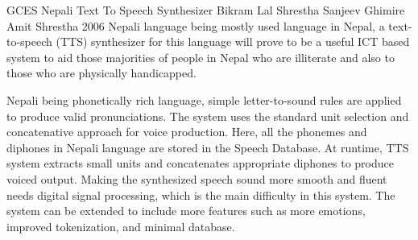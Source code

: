  \begin{conf-abstract}[]
{GCES Nepali Text To Speech Synthesizer}
{
Bikram Lal Shrestha
Sanjeev Ghimire
Amit Shrestha
}
{2006}
Nepali language being mostly used language in Nepal, a text- to-speech (TTS) synthesizer for this language will prove to be a useful ICT based system to aid those majorities of people in Nepal who are illiterate and also to those who are physically handicapped.

Nepali being phonetically rich language, simple letter-to-sound rules are applied to produce valid pronunciations. The system uses the standard unit selection and concatenative approach for voice production. Here, all the phonemes and diphones in Nepali language are stored in the Speech Database. At runtime, TTS system extracts small units and concatenates appropriate diphones to produce voiced output. Making the synthesized speech sound more smooth and fluent needs digital signal processing,  which is the main difficulty in this system. The system can be extended to include more features such as more emotions, improved tokenization, and minimal database.
  \end{conf-abstract}